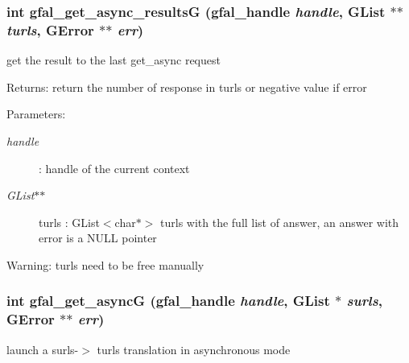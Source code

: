\subsubsection{\setlength{\rightskip}{0pt plus 5cm}int gfal\_\-get\_\-async\_\-results\-G (gfal\_\-handle {\em handle}, GList $\ast$$\ast$ {\em turls}, GError $\ast$$\ast$ {\em err})}\label{gfal__common__srm_8h_1c3a2a23f764ce8bf5cdd73108e4d9ca}


get the result to the last get\_\-async request \begin{Desc}
\item[Returns:]return the number of response in turls or negative value if error \end{Desc}
\begin{Desc}
\item[Parameters:]
\begin{description}
\item[{\em handle}]: handle of the current context \item[{\em GList$\ast$$\ast$}]turls : GList$<$char$\ast$$>$ turls with the full list of answer, an answer with error is a NULL pointer \end{description}
\end{Desc}
\begin{Desc}
\item[Warning:]turls need to be free manually \end{Desc}
\subsubsection{\setlength{\rightskip}{0pt plus 5cm}int gfal\_\-get\_\-async\-G (gfal\_\-handle {\em handle}, GList $\ast$ {\em surls}, GError $\ast$$\ast$ {\em err})}\label{gfal__common__srm_8h_95ffd4de24c18af334c1d9c270de7d81}


launch a surls-$>$ turls translation in asynchronous mode 

